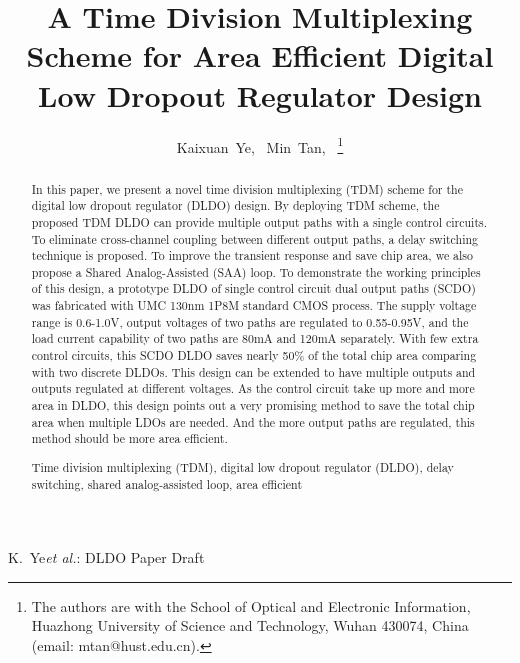 \documentclass[journal]{IEEEtran}
\begin{document}
\title{A Time Division Multiplexing Scheme for Area Efficient Digital Low Dropout Regulator Design}
\author{
        Kaixuan~Ye,~
        Min~Tan,~%
\thanks{The authors are with the School of Optical and Electronic Information,
Huazhong University of Science and Technology, Wuhan 430074, China (email:
mtan@hust.edu.cn).}
        }

%
{K.~Ye\MakeLowercase{\textit{et al.}}: DLDO Paper Draft}


\maketitle

\begin{abstract}
In this paper, we present a novel time division multiplexing (TDM) scheme for the digital low dropout regulator (DLDO) design. By deploying TDM scheme, the proposed TDM DLDO can provide multiple output paths with a single control circuits. To eliminate cross-channel coupling between different output paths, a delay switching technique is proposed. To improve the transient response and save chip area, we also propose a Shared Analog-Assisted (SAA) loop. To demonstrate the working principles of this design, a prototype DLDO of single control circuit dual output paths (SCDO) was fabricated with UMC 130nm 1P8M standard CMOS process. The supply voltage range is 0.6-1.0V, output voltages of two paths are regulated to 0.55-0.95V, and the load current capability of two paths are 80mA and 120mA separately. With few extra control circuits, this SCDO DLDO saves nearly 50\% of the total chip area comparing with two discrete DLDOs. This design can be extended to have multiple outputs and outputs regulated at different voltages. As the control circuit take up more and more area in DLDO, this design points out a very promising method to save the total chip area when multiple LDOs are needed. And the more output paths are regulated, this method should be more area efficient.\\

\begin{IEEEkeywords}
Time division multiplexing (TDM), digital low dropout regulator (DLDO), delay switching, shared analog-assisted loop, area efficient
\end{IEEEkeywords}
\end{abstract}
\end{document}

